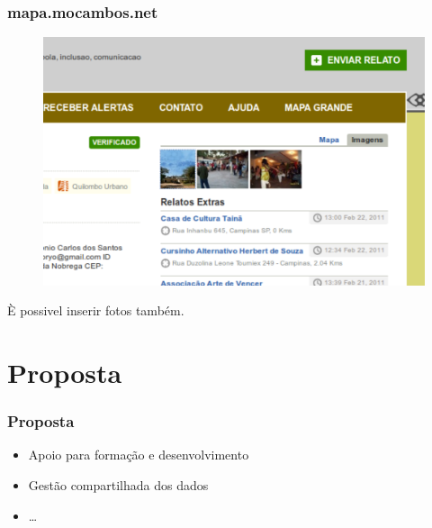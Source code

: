 \documentclass{beamer}
\begin{document}
{\begin{frame}
  \frametitle{mapa.mocambos.net}
	\begin{figure}
          \vfill
          \includegraphics[height=0.6\textheight]{./FIG/mapa_relato3.pdf}
 	\end{figure}
        È possivel inserir fotos também.
\end{frame}

\section{Proposta}

\begin{frame}
  \frametitle{Proposta}
  \begin{itemize}
    \item Apoio para formação e desenvolvimento
    \item Gestão compartilhada dos dados
    \item \ldots
    \end{itemize}

\end{frame}






}
\end{document}
